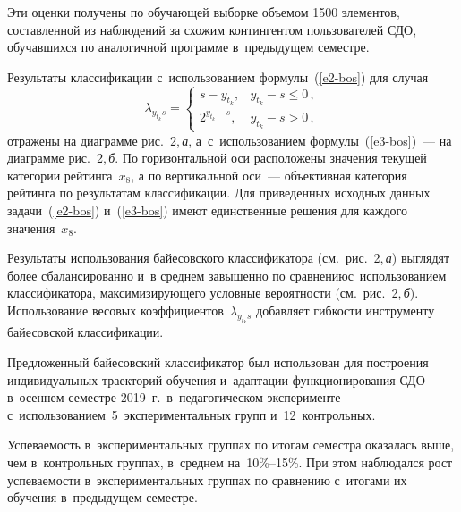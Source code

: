 \begin{multicols}{2}
{}



      Эти оценки получены по обучающей выборке объемом 1500 элементов, 
составленной из наблюдений за схожим контингентом пользователей СДО, обучавшихся 
по аналогичной программе в~предыду\-щем семестре.



       Результаты классификации с~использованием формулы~(\ref{e2-bos}) для случая
      $$
      \lambda_{y_{t_k}s}= \begin{cases}
      s-y_{t_k}, & y_{t_k}-s\leq 0\,,\\
      2^{y_{t_k}-s}, & y_{t_k}-s> 0\,,
      \end{cases}
      $$
      отражены на диаграмме рис.~2,\,\textit{а}, а~с~использованием формулы~(\ref{e3-bos})~--- на 
диаграмме рис.~2,\,\textit{б}. По горизонтальной оси расположены значения текущей категории 
рейтинга~$x_8$, а по вертикальной оси~--- объективная категория рейтинга по 
результатам классификации. Для приведенных исходных данных задачи~(\ref{e2-bos}) 
и~(\ref{e3-bos}) имеют единственные решения для каждого значения~$x_8$.



      
      Результаты использования байесовского классификатора 
      (см.\ рис.~2,\,\textit{а}) выглядят более 
сбалансированно и~в среднем завышенно по сравнению\linebreak с~использованием 
классификатора, максими\-зи\-рующего условные вероятности 
(см.\ рис.~2,\,\textit{б}).\linebreak 
Использование 
весовых коэффициентов~$\lambda_{y_{t_k}s}$ добавляет гибкости инструменту 
байесовской классификации.

      Предложенный байесовский классификатор был использован для построения 
индивидуальных траекторий обучения и~адаптации функционирования СДО в~осеннем 
семестре 2019~г.\ в~педагогическом эксперименте 
с~использованием~5~экспериментальных групп и~12~контрольных. 


 

Успеваемость в~экспериментальных 
группах по итогам семестра оказалась выше, чем в~контрольных группах, в~среднем  
на~10\%--15\%. При этом наблюдался рост успеваемости в~экспериментальных группах 
по сравнению с~итогами их обучения в~предыдущем семестре.

\vspace*{-6pt}


\end{multicols}
